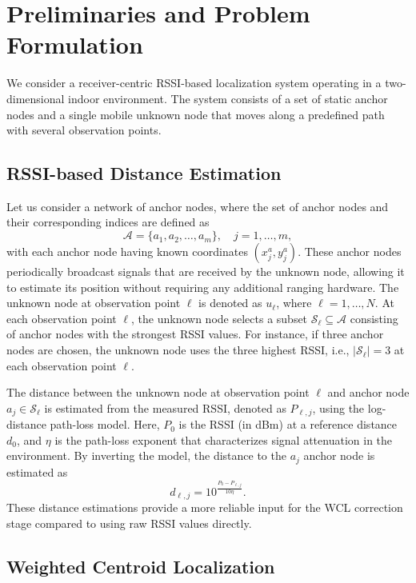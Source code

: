 \documentclass[journal]{IEEEtran}
\begin{document}
\section{Preliminaries and Problem Formulation}
\label{problem}

We consider a receiver-centric RSSI-based localization system operating in a two-dimensional indoor environment. The system consists of a set of static anchor nodes and a single mobile unknown node that moves along a predefined path with several observation points.

\subsection{RSSI-based Distance Estimation}

Let us consider a network of anchor nodes, where the set of anchor nodes and their corresponding indices are defined as
\[
\mathcal{A} = \{a_1, a_2, \ldots, a_m\}, \quad j = 1, \dots, m,
\]
with each anchor node having known coordinates $(x^a_j, y^a_j)$. These anchor nodes periodically broadcast signals that are received by the unknown node, allowing it to estimate its position without requiring any additional ranging hardware. The unknown node at observation point $\ell$ is denoted as $u_{\ell}$, where $\ell = 1, \dots, N$. At each observation point $\ell$, the unknown node selects a subset $\mathcal{S}_\ell \subseteq \mathcal{A}$ consisting of anchor nodes with the strongest RSSI values. For instance, if three anchor nodes are chosen, the unknown node uses the three highest RSSI, i.e., $|\mathcal{S}_{\ell}| = 3$ at each observation point $\ell$.

The distance between the unknown node at observation point $\ell$ and anchor node $a_j \in \mathcal{S}_{\ell}$ is estimated from the measured RSSI, denoted as $P_{\ell,j}$, using the log-distance path-loss model. Here, $P_0$ is the RSSI (in dBm) at a reference distance $d_0$, and $\eta$ is the path-loss exponent that characterizes signal attenuation in the environment. By inverting the model, the distance to the $a_j$ anchor node is estimated as
\[
d_{\ell,j} = 10^{\frac{P_0 - P_{\ell,j}}{10\eta}}.
\]
These distance estimations provide a more reliable input for the WCL correction stage compared to using raw RSSI values directly.



\subsection{Weighted Centroid Localization}
\label{wcl}
\end{document}
